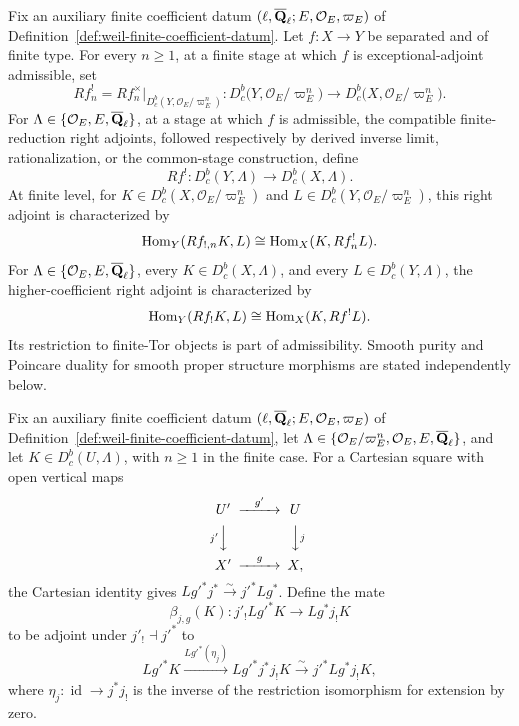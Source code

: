 \begin{definition}
\label{def:exceptional-inverse-image}


Fix an auxiliary finite coefficient datum
\((\ell,\overline{\mathbf Q}_\ell;E,\mathcal O_E,\varpi_E)\) of
Definition~\ref{def:weil-finite-coefficient-datum}.  Let
\(f:X\to Y\) be separated and of finite type.  For every \(n\geq1\), at a finite stage at which
\(f\) is exceptional-adjoint admissible, set
\[
 Rf_n^!=Rf_n^{\times}|_{D^b_c(Y,\mathcal O_E/\varpi_E^n)}:
 D^b_c\bigl(Y,\mathcal O_E/\varpi_E^n\bigr)
 \longrightarrow D^b_c\bigl(X,\mathcal O_E/\varpi_E^n\bigr).
\]
For \(\Lambda\in\{\mathcal O_E,E,\overline{\mathbf Q}_\ell\}\), at a stage at which \(f\) is
admissible, the compatible finite-reduction right adjoints, followed
respectively by derived inverse limit, rationalization, or the common-stage
construction, define
\[
 Rf^!:D^b_c(Y,\Lambda)\longrightarrow D^b_c(X,\Lambda).
\]
At finite level, for
\(K\in D^b_c(X,\mathcal O_E/\varpi_E^n)\) and
\(L\in D^b_c(Y,\mathcal O_E/\varpi_E^n)\), this right adjoint is
characterized by
\[
 \operatorname{Hom}_Y(Rf_{!,n}K,L)\cong\operatorname{Hom}_X(K,Rf_n^!L).
\]
For \(\Lambda\in\{\mathcal O_E,E,\overline{\mathbf Q}_\ell\}\), every
\(K\in D^b_c(X,\Lambda)\), and every \(L\in D^b_c(Y,\Lambda)\), the
higher-coefficient right adjoint is characterized by
\[
 \operatorname{Hom}_Y(Rf_!K,L)\cong\operatorname{Hom}_X(K,Rf^!L).
\]
Its restriction to finite-Tor objects is part of admissibility.  Smooth
purity and Poincare duality for smooth proper structure morphisms are stated
independently below.
\end{definition}


\begin{definition}
\label{def:open-extension-base-change-mate}


Fix an auxiliary finite coefficient datum
\((\ell,\overline{\mathbf Q}_\ell;E,\mathcal O_E,\varpi_E)\) of
Definition~\ref{def:weil-finite-coefficient-datum}, let
\(\Lambda\in\{\mathcal O_E/\varpi_E^n,\mathcal O_E,E,\overline{\mathbf Q}_\ell\}\), and let
\(K\in D^b_c(U,\Lambda)\), with \(n\geq1\) in the finite case.  For a
Cartesian square with open vertical maps
\[
\begin{CD}
U' @>{g'}>> U\\
@V{j'}VV @VV{j}V\\
X' @>{g}>> X,
\end{CD}
\]
the Cartesian identity gives
\(Lg'^*j^*\xrightarrow{\sim}j'^*Lg^*\).  Define the mate
\[
 \beta_{j,g}(K):j'_!Lg'^*K\longrightarrow Lg^*j_!K
\]
to be adjoint under \(j'_!\dashv j'^*\) to
\[
 Lg'^*K\xrightarrow{Lg'^*(\eta_j)}Lg'^*j^*j_!K
 \xrightarrow{\sim}j'^*Lg^*j_!K,
\]
where \(\eta_j:\operatorname{id}\to j^*j_!\) is the inverse of the
restriction isomorphism for extension by zero.
\end{definition}

